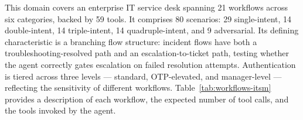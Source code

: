 This domain covers an enterprise IT service desk spanning 21 workflows across six categories, backed by 59 tools. It comprises 80 scenarios: 29 single-intent, 14 double-intent, 14 triple-intent, 14 quadruple-intent, and 9 adversarial. Its defining characteristic is a branching flow structure: incident flows have both a troubleshooting-resolved path and an escalation-to-ticket path, testing whether the agent correctly gates escalation on failed resolution attempts. Authentication is tiered across three levels — standard, OTP-elevated, and manager-level — reflecting the sensitivity of different workflows. Table~\ref{tab:workflows-itsm} provides a description of each workflow, the expected number of tool calls, and the tools invoked by the agent.


